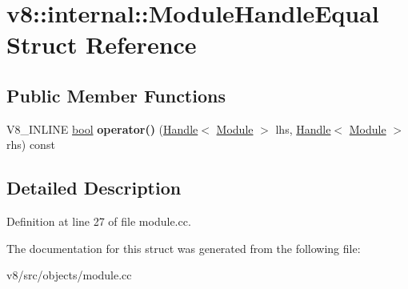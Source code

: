 \hypertarget{structv8_1_1internal_1_1ModuleHandleEqual}{}\section{v8\+:\+:internal\+:\+:Module\+Handle\+Equal Struct Reference}
\label{structv8_1_1internal_1_1ModuleHandleEqual}
\subsection*{Public Member Functions}
\begin{DoxyCompactItemize}
\item 
\mbox{\label{structv8_1_1internal_1_1ModuleHandleEqual_ae66cbfada8d9c32a6d7623891257ea29}} 
V8\+\_\+\+I\+N\+L\+I\+NE \mbox{\hyperlink{classbool}{bool}} {\bfseries operator()} (\mbox{\hyperlink{classv8_1_1internal_1_1Handle}{Handle}}$<$ \mbox{\hyperlink{classv8_1_1internal_1_1Module}{Module}} $>$ lhs, \mbox{\hyperlink{classv8_1_1internal_1_1Handle}{Handle}}$<$ \mbox{\hyperlink{classv8_1_1internal_1_1Module}{Module}} $>$ rhs) const
\end{DoxyCompactItemize}


\subsection{Detailed Description}


Definition at line 27 of file module.\+cc.



The documentation for this struct was generated from the following file\+:\begin{DoxyCompactItemize}
\item 
v8/src/objects/module.\+cc\end{DoxyCompactItemize}
